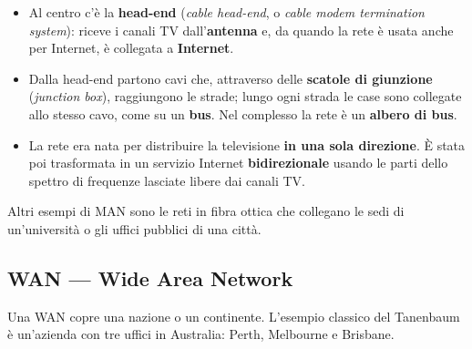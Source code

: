 \begin{itemize}
    \item Al centro c'è la \textbf{head-end} (\emph{cable head-end}, o \emph{cable modem termination
          system}): riceve i canali TV dall'\textbf{antenna} e, da quando la rete è usata anche per
          Internet, è collegata a \textbf{Internet}.
    \item Dalla head-end partono cavi che, attraverso delle \textbf{scatole di giunzione}
          (\emph{junction box}), raggiungono le strade; lungo ogni strada le case sono collegate allo
          stesso cavo, come su un \textbf{bus}. Nel complesso la rete è un \textbf{albero di bus}.
    \item La rete era nata per distribuire la televisione \textbf{in una sola direzione}. È stata poi
          trasformata in un servizio Internet \textbf{bidirezionale} usando le parti dello spettro di
          frequenze lasciate libere dai canali TV.
\end{itemize}

Altri esempi di MAN sono le reti in fibra ottica che collegano le sedi di un'università o gli
uffici pubblici di una città.

\subsection{WAN --- Wide Area Network}

Una WAN copre una nazione o un continente. L'esempio classico del Tanenbaum è un'azienda con
tre uffici in Australia: Perth, Melbourne e Brisbane.



